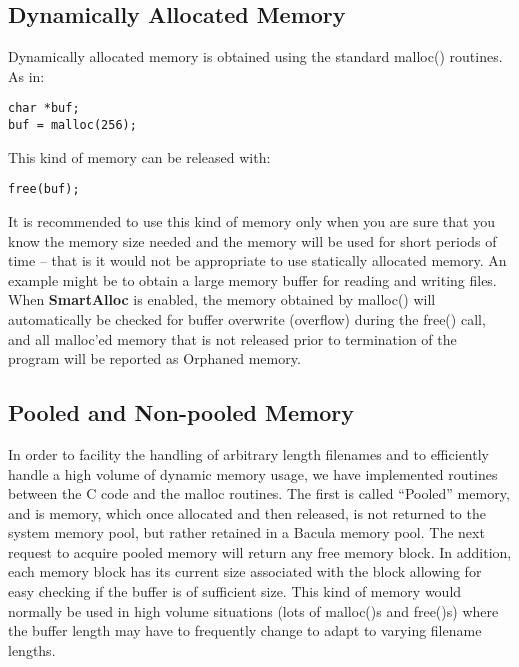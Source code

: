 \subsection{Dynamically Allocated Memory}

Dynamically allocated memory is obtained using the standard malloc() routines.
As in: 

\footnotesize
\begin{verbatim}
char *buf;
buf = malloc(256);
\end{verbatim}
\normalsize

This kind of memory can be released with: 

\footnotesize
\begin{verbatim}
free(buf);
\end{verbatim}
\normalsize

It is recommended to use this kind of memory only when you are sure that you
know the memory size needed and the memory will be used for short periods of
time -- that is it would not be appropriate to use statically allocated
memory. An example might be to obtain a large memory buffer for reading and
writing files. When {\bf SmartAlloc} is enabled, the memory obtained by
malloc() will automatically be checked for buffer overwrite (overflow) during
the free() call, and all malloc'ed memory that is not released prior to
termination of the program will be reported as Orphaned memory. 

\subsection{Pooled and Non-pooled Memory}

In order to facility the handling of arbitrary length filenames and to
efficiently handle a high volume of dynamic memory usage, we have implemented
routines between the C code and the malloc routines. The first is called
``Pooled'' memory, and is memory, which once allocated and then released, is
not returned to the system memory pool, but rather retained in a Bacula memory
pool. The next request to acquire pooled memory will return any free memory
block. In addition, each memory block has its current size associated with the
block allowing for easy checking if the buffer is of sufficient size. This
kind of memory would normally be used in high volume situations (lots of
malloc()s and free()s) where the buffer length may have to frequently change
to adapt to varying filename lengths. 


